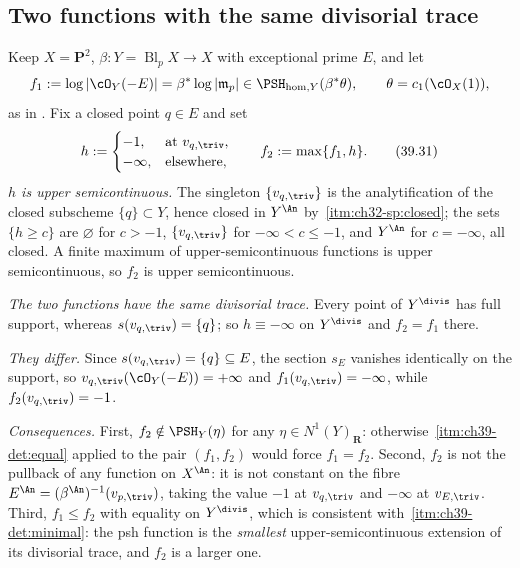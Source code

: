 \subsection{Two functions with the same divisorial trace}
\label{sec:ch39-determination-examples}

\begin{example}
\label{ex:ch39-usc-not-determined-birational}
Keep $X=\mathbf P^2$, $\beta:Y=\operatorname{Bl}_pX\to X$ with
exceptional prime $E$, and let
\[
 f_1:=\log|\cO_Y(-E)|=\beta^*\log|\mathfrak m_p|
 \in\PSH_{\mathrm{hom},Y}(\beta^*\theta),
 \qquad\theta=c_1(\cO_X(1)),
\]
as in .  Fix a closed point $q\in E$ and set
\[
 h:=\begin{cases}-1,&\text{at }v_{q,\triv},\\ -\infty,&\text{elsewhere},
 \end{cases}
 \qquad
 f_2:=\max\{f_1,h\}.
\tag{39.31}\label{eq:ch39-two-usc}
\]
\emph{$h$ is upper semicontinuous.}  The singleton $\{v_{q,\triv}\}$ is
the analytification of the closed subscheme $\{q\}\subset Y$, hence closed
in $Y^{\An}$ by
\,\cref{itm:ch32-sp:closed}; the sets
$\{h\ge c\}$ are $\varnothing$ for $c>-1$, $\{v_{q,\triv}\}$ for
$-\infty<c\le-1$, and $Y^{\An}$ for $c=-\infty$, all closed.  A finite
maximum of upper-semicontinuous functions is upper semicontinuous, so
$f_2$ is upper semicontinuous.

\emph{The two functions have the same divisorial trace.}  Every point of
$Y^{\divis}$ has full support, whereas $s(v_{q,\triv})=\{q\}$; so
$h\equiv-\infty$ on $Y^{\divis}$ and $f_2=f_1$ there.

\emph{They differ.}  Since $s(v_{q,\triv})=\{q\}\subseteq E$, the section
$s_E$ vanishes identically on the support, so
$v_{q,\triv}(\cO_Y(-E))=+\infty$ and
$f_1(v_{q,\triv})=-\infty$, while $f_2(v_{q,\triv})=-1$.

\emph{Consequences.}  First, $f_2\notin\PSH_Y(\eta)$ for any
$\eta\in N^1(Y)_{\mathbf R}$: otherwise
\,\cref{itm:ch39-det:equal} applied to
the pair $(f_1,f_2)$ would force $f_1=f_2$.  Second, $f_2$ is not the
pullback of any function on $X^{\An}$: it is not constant on the fibre
$E^{\An}=(\beta^{\An})^{-1}(v_{p,\triv})$, taking the value $-1$ at
$v_{q,\triv}$ and $-\infty$ at $v_{E,\triv}$.  Third,
$f_1\le f_2$ with equality on $Y^{\divis}$, which is consistent with
\,\cref{itm:ch39-det:minimal}: the psh
function is the \emph{smallest} upper-semicontinuous extension of its
divisorial trace, and $f_2$ is a larger one.


\end{example}

